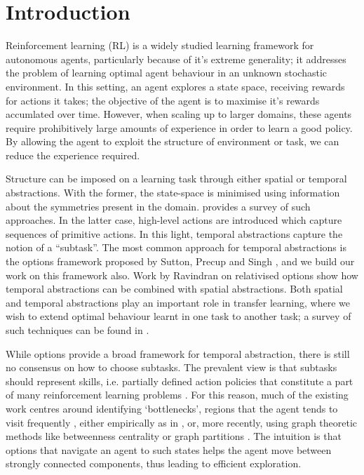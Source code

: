 \section{Introduction}
\label{sec:intro}

Reinforcement learning (RL) is a widely studied learning framework for
autonomous agents, particularly because of it's extreme generality; it
addresses the problem of learning optimal agent behaviour in an unknown
stochastic environment. In this setting, an agent explores a state
space, receiving rewards for actions it takes; the objective of the
agent is to maximise it's rewards accumlated over time. However, when
scaling up to larger domains, these agents require prohibitively large
amounts of experience in order to learn a good policy. By allowing the
agent to exploit the structure of environment or task, we can reduce the
experience required.

Structure can be imposed on a learning task through either spatial or
temporal abstractions. With the former, the state-space is minimised
using information about the symmetries present in the domain.
\cite{Li2006} provides a survey of such approaches. In the latter case,
high-level actions are introduced which capture sequences of primitive
actions. In this light, temporal abstractions capture the notion of
a ``subtask''. The most common approach for temporal abstractions is the
options framework proposed by Sutton, Precup and Singh
\cite{SuttonPrecupSingh1998}, and we build our work on this framework
also. Work by Ravindran on relativised options \cite{Ravindran2003} show
how temporal abstractions can be combined with spatial abstractions.
Both spatial and temporal abstractions play an important role in
transfer learning, where we wish to extend optimal behaviour learnt in
one task to another task; a survey of such techniques can be found in
\cite{Taylor2009a}.

While options provide a broad framework for temporal abstraction, there
is still no consensus on how to choose subtasks. The prevalent view is
that subtasks should represent skills, i.e. partially defined action
policies that constitute a part of many reinforcement learning problems
\cite{Thrun1995}. For this reason, much of the existing work centres
around identifying `bottlenecks', regions that the agent tends to visit
frequently \cite{McGovern2001}, either empirically as in
\cite{McGovern2001}, or, more recently, using graph theoretic methods
like betweenness centrality \cite{Simsek2008} or graph partitions
\cite{Menache2002}. The intuition is that options that navigate an agent
to such states helps the agent move between strongly connected
components, thus leading to efficient exploration. 

